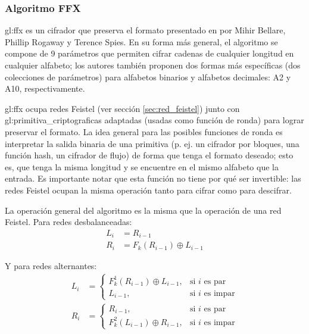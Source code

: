 %
%

\subsubsection{Algoritmo FFX}
\label{sec:ffx}

\Gls{gl:ffx} es un cifrador que preserva el formato presentado en \cite{ffx_1}
por Mihir Bellare, Phillip Rogaway y Terence Spies.  En su forma más general,
el algoritmo se compone de 9 parámetros que permiten cifrar cadenas de
cualquier longitud en cualquier alfabeto; los autores también proponen dos
formas más específicas (dos colecciones de parámetros) para alfabetos binarios
y alfabetos decimales: A2 y A10, respectivamente.

\Gls{gl:ffx} ocupa redes Feistel (ver sección \ref{sec:red_feistel}) junto con
\glspl{gl:primitiva_criptografica} adaptadas (usadas como función de ronda) para
lograr preservar el formato. La idea general para las posibles funciones de
ronda es interpretar la salida binaria de una primitiva (p. ej. un cifrador por
bloques, una función hash, un cifrador de flujo) de forma que tenga el formato
deseado; esto es, que tenga la misma longitud y se encuentre en el mismo
alfabeto que la entrada. Es importante notar que esta función no tiene por qué
ser invertible: las redes Feistel ocupan la misma operación tanto para cifrar
como para descifrar.

La operación general del algoritmo es la misma que la operación de una red
Feistel. Para redes desbalanceadas:
\begin{equation}
  \begin{split}
    L_{i} &= R_{i - 1} \\
    R_{i} &= F_k(R_{i - 1}) \oplus L_{i - 1}
  \end{split}
\end{equation}

Y para redes alternantes:
\begin{equation}
  \begin{split}
    L_{i} &=
    \begin{cases}
      F^1_k(R_{i - 1}) \oplus L_{i - 1},  & \text{si } i \text{ es par} \\
      L_{i - 1},                          & \text{si } i \text{ es impar}
    \end{cases}
    \\
    R_{i} &=
    \begin{cases}
      R_{i - 1},                          & \text{si } i \text{ es par} \\
      F^2_k(L_{i - 1}) \oplus R_{i - 1},  & \text{si } i \text{ es impar}
    \end{cases}
  \end{split}
\end{equation}

